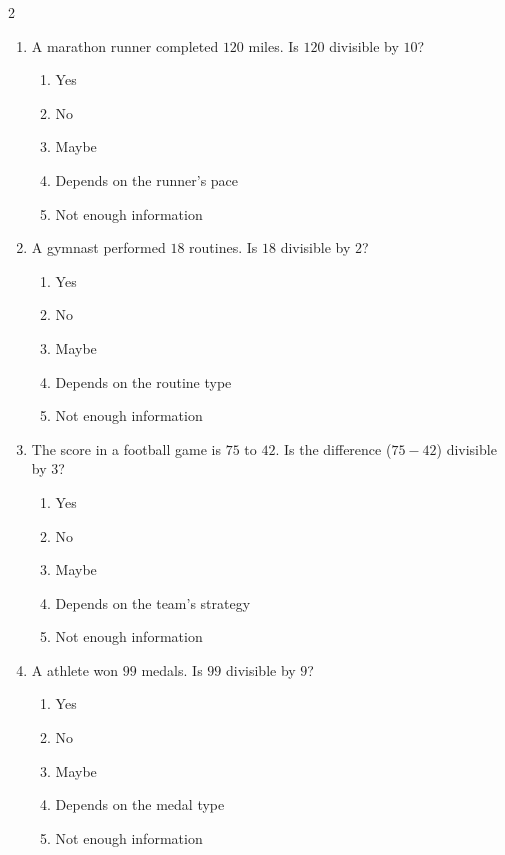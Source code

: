 \documentclass[10pt]{article}
\begin{document}
\begin{multicols}{2}
\begin{enumerate}[label=\textbf{Q\arabic*.}, leftmargin=*, itemsep=6pt, parsep=0pt]
  \item \small A marathon runner completed $120$ miles. Is $120$ divisible by $10$?
  \begin{enumerate}[label=(\Alph*), leftmargin=0.6cm, nosep, itemsep=2pt]
    \item Yes
    \item No
    \item Maybe
    \item Depends on the runner's pace
    \item Not enough information
  \end{enumerate}

  \item \small A gymnast performed $18$ routines. Is $18$ divisible by $2$?
  \begin{enumerate}[label=(\Alph*), leftmargin=0.6cm, nosep, itemsep=2pt]
    \item Yes
    \item No
    \item Maybe
    \item Depends on the routine type
    \item Not enough information
  \end{enumerate}

  \item \small The score in a football game is $75$ to $42$. Is the difference ($75 - 42$) divisible by $3$?
  \begin{enumerate}[label=(\Alph*), leftmargin=0.6cm, nosep, itemsep=2pt]
    \item Yes
    \item No
    \item Maybe
    \item Depends on the team's strategy
    \item Not enough information
  \end{enumerate}

  \item \small A athlete won $99$ medals. Is $99$ divisible by $9$?
  \begin{enumerate}[label=(\Alph*), leftmargin=0.6cm, nosep, itemsep=2pt]
    \item Yes
    \item No
    \item Maybe
    \item Depends on the medal type
    \item Not enough information
  \end{enumerate}


\end{enumerate}
\end{multicols}
\end{document}
